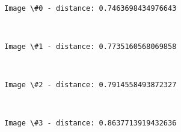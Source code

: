 \documentclass[11pt]{article}
\begin{document}
    \begin{center}
    \end{center}
    { \hspace*{\fill} \\}
    
    \begin{Verbatim}[commandchars=\\\{\}]
Image \#0 - distance: 0.7463698434976643

    \end{Verbatim}

    \begin{center}
    \end{center}
    { \hspace*{\fill} \\}
    
    \begin{Verbatim}[commandchars=\\\{\}]
Image \#1 - distance: 0.7735160568069858

    \end{Verbatim}

    \begin{center}
    \end{center}
    { \hspace*{\fill} \\}
    
    \begin{Verbatim}[commandchars=\\\{\}]
Image \#2 - distance: 0.7914558493872327

    \end{Verbatim}

    \begin{center}
    \end{center}
    { \hspace*{\fill} \\}
    
    \begin{Verbatim}[commandchars=\\\{\}]
Image \#3 - distance: 0.8637713919432636

    \end{Verbatim}

    \begin{center}
    \end{center}
    { \hspace*{\fill} \\}
    
\end{document}
